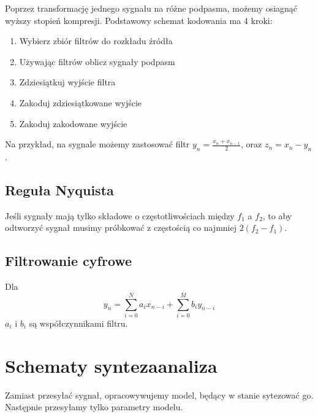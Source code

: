 \documentclass{../notatki}
\begin{document}
Poprzez transformację jednego sygnału na różne podpasma, możemy
osiagnąć wyższy stopień kompresji. Podstawowy schemat kodowania ma 4 kroki:
\begin{enumerate}
\item Wybierz zbiór filtrów do rozkładu źródła
\item Używając filtrów oblicz sygnały podpasm
\item Zdziesiątkuj wyjście filtra
\item Zakoduj zdziesiątkowane wyjście
\item Zakoduj zakodowane wyjście
\end{enumerate}

Na przykład, na sygnale możemy zastosować filtr $y_n = \frac{x_n +
x_{n - 1}}{2}$, oraz $z_n = x_n - y_n$.

\subsection{Reguła Nyquista}

Jeśli sygnały mają tylko składowe o częstotliwościach między $f_1$ a $f_2$, to
aby odtworzyć sygnał musimy próbkować z częstością co najmniej $2(f_2 - f_1)$.

\subsection{Filtrowanie cyfrowe}

Dla
$$
y_n =\sum_{i=0}^{N} a_i x_{n-i} + \sum_{i=0}^{M} b_i y_{n-i}
$$
$a_i$ i $b_i$ są współczynnikami filtru.

\section{Schematy synteza\-analiza}

Zamiast przesyłać sygnał, opracowywujemy model, będący w stanie sytezować go.
Następnie przesyłamy tylko parametry modelu.
\end{document}
